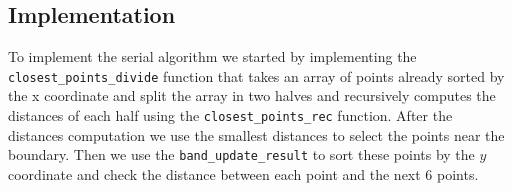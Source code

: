 \subsection{Implementation}
To implement the serial algorithm we started by implementing the \verb+closest_points_divide+
function that takes an array of points already sorted by the x coordinate and split the array in two
halves and recursively computes the distances of each half using the \verb+closest_points_rec+
function. After the distances computation we use the smallest distances to select the points
near the boundary. Then we use the \verb+band_update_result+ to sort these points by the $y$ coordinate
and check the distance between each point and the next 6 points.

